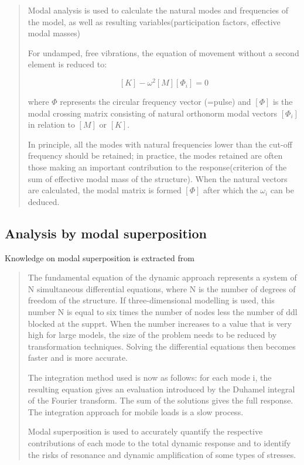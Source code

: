 \begin{quote}

Modal analysis is used to calculate the natural modes and frequencies of the model, as well as resulting variables(participation factors, effective modal masses)

For undamped, free vibrations, the equation of movement without a second element is reduced to:

$$  [K] - \omega^2[M][\Phi_i] = 0 $$

where $\Phi$ represents the circular frequency vector (=pulse) and $[\Phi]$ is the modal crossing matrix consisting of natural orthonorm modal vectors $[\Phi_i]$ in relation to $[M]$ or $[K]$.

In principle, all the modes with natural frequencies lower than the cut-off frequency should be retained; in practice, the modes retained are often those making an important contribution to the response(criterion of the sum of effective modal mass of the structure). When the natural vectors are calculated, the modal matrix is formed $[\Phi]$ after which the $\omega_i$ can be deduced.

\end{quote}

\subsection{Analysis by modal superposition}

Knowledge on modal superposition is extracted from \citet{UIC776-2}

\begin{quote}
The fundamental equation of the dynamic approach represents a system of N simultaneous differential equations, where N is the number of degrees of freedom of the structure. If three-dimensional modelling is used, this number N is equal to six times the number of nodes less the number of ddl blocked at the supprt. When the number increases to a value that is very high for large models, the size of the problem needs to be reduced by transformation techniques. Solving the differential equations then becomes faster and is more accurate.

The integration method used is now as follows: for each mode i, the resulting equation gives an evaluation introduced by the Duhamel integral of the Fourier transform. The sum of the solutions gives the full response. The integration approach for mobile loads is a slow process.

Modal superposition is used to accurately quantify the respective contributions of each mode to the total dynamic response and to identify the risks of resonance and dynamic amplification of some types of stresses.
\end{quote}

